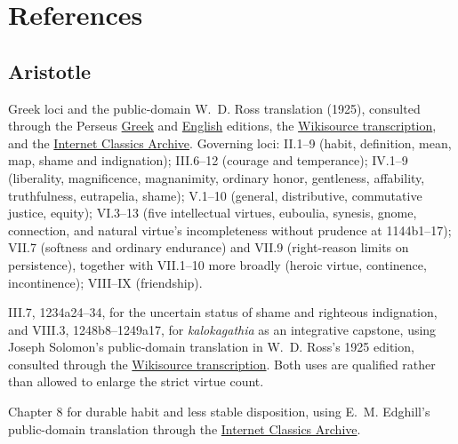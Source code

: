 \section{References}
\label{sec:references}

\subsection{Aristotle}

\begin{description}[leftmargin=1.6em,style=nextline,itemsep=0.45em]
  \item[\emph{Nicomachean Ethics}.]
  Greek loci and the public-domain W.~D. Ross translation (1925), consulted through the Perseus \href{https://www.perseus.tufts.edu/hopper/text?doc=Perseus:text:1999.01.0053}{Greek} and \href{https://www.perseus.tufts.edu/hopper/text?doc=Perseus:text:1999.01.0054}{English} editions, the \href{https://en.wikisource.org/wiki/Nicomachean_Ethics_(Ross)}{Wikisource transcription}, and the \href{https://classics.mit.edu/Aristotle/nicomachaen.html}{Internet Classics Archive}. Governing loci: II.1--9 (habit, definition, mean, map, shame and indignation); III.6--12 (courage and temperance); IV.1--9 (liberality, magnificence, magnanimity, ordinary honor, gentleness, affability, truthfulness, eutrapelia, shame); V.1--10 (general, distributive, commutative justice, equity); VI.3--13 (five intellectual virtues, euboulia, synesis, gnome, connection, and natural virtue's incompleteness without prudence at 1144b1--17); VII.7 (softness and ordinary endurance) and VII.9 (right-reason limits on persistence), together with VII.1--10 more broadly (heroic virtue, continence, incontinence); VIII--IX (friendship).

  \item[\emph{Eudemian Ethics}.]
  III.7, 1234a24--34, for the uncertain status of shame and righteous indignation, and VIII.3, 1248b8--1249a17, for \emph{kalokagathia} as an integrative capstone, using Joseph Solomon's public-domain translation in W.~D. Ross's 1925 edition, consulted through the \href{https://en.wikisource.org/wiki/Eudemian_Ethics}{Wikisource transcription}. Both uses are qualified rather than allowed to enlarge the strict virtue count.

  \item[\emph{Categories}.]
  Chapter 8 for durable habit and less stable disposition, using E.~M. Edghill's public-domain translation through the \href{https://classics.mit.edu/Aristotle/categories.1.1.html}{Internet Classics Archive}.
\end{description}

